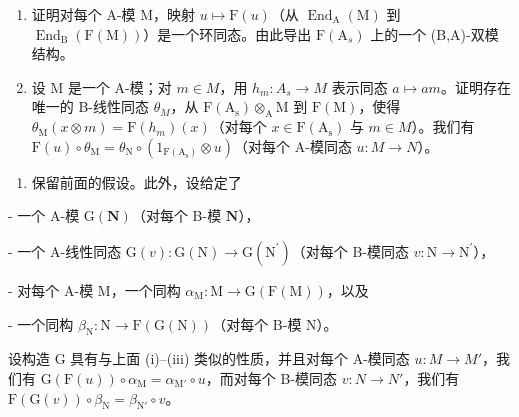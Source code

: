 \begin{enumerate}
\def\labelenumi{\alph{enumi})}
\item
  证明对每个 A-模 M，映射 \(u \mapsto \mathrm{F}(u)\)（从 \(\operatorname{End}_{\mathrm{A}}(\mathrm{M})\) 到 \(\operatorname{End}_{\mathrm{B}}(\mathrm{F}(\mathrm{M}))\)）是一个环同态。由此导出 \(\mathrm{F}(\mathrm{A}_{s})\) 上的一个 (B,A)-双模结构。
\item
  设 M 是一个 A-模；对 \(m \in M\)，用 \(h_{m} : A_{s} \to M\) 表示同态 \(a \mapsto am\)。证明存在唯一的 B-线性同态 \(\theta_{M}\)，从 \(\mathrm{F(A_{s})} \otimes_{\mathrm{A}} \mathrm{M}\) 到 \(\mathrm{F(M)}\)，使得 \(\theta_{\mathrm{M}}(x \otimes m) = \mathrm{F}(h_{m})(x)\)（对每个 \(x \in \mathrm{F(A_{s})}\) 与 \(m \in M\)）。我们有 \(\mathrm{F}(u) \circ \theta_{\mathrm{M}} = \theta_{\mathrm{N}} \circ (1_{\mathrm{F(A_{s})}} \otimes u)\)（对每个 A-模同态 \(u : M \to N\)）。
\end{enumerate}

\begin{enumerate}
\def\labelenumi{\arabic{enumi})}
\setcounter{enumi}{6}
\tightlist
\item
  保留前面的假设。此外，设给定了
\end{enumerate}

- 一个 A-模 \(\mathrm{G}(\mathbf{N})\)（对每个 B-模 \(\mathbf{N}\)），

- 一个 A-线性同态 \(\mathrm{G}(v):\mathrm{G}(\mathrm{N})\to \mathrm{G}(\mathrm{N}^{\prime})\)（对每个 B-模同态 \(v:\mathrm{N}\rightarrow \mathrm{N}^{\prime}\)），

- 对每个 A-模 M，一个同构 \(\alpha_{\mathrm{M}}: \mathrm{M} \to \mathrm{G}(\mathrm{F}(\mathrm{M}))\)，以及

- 一个同构 \(\beta_{\mathrm{N}}: \mathrm{N} \to \mathrm{F}(\mathrm{G}(\mathrm{N}))\)（对每个 B-模 \(\mathrm{N}\)）。

设构造 G 具有与上面 (i)–(iii) 类似的性质，并且对每个 A-模同态 \(u: M \to M'\)，我们有 \(\mathrm{G}(\mathrm{F}(u)) \circ \alpha_{\mathrm{M}} = \alpha_{\mathrm{M}'} \circ u\)，而对每个 B-模同态 \(v: N \to N'\)，我们有 \(\mathrm{F}(\mathrm{G}(v)) \circ \beta_{\mathrm{N}} = \beta_{\mathrm{N}'} \circ v\)。

